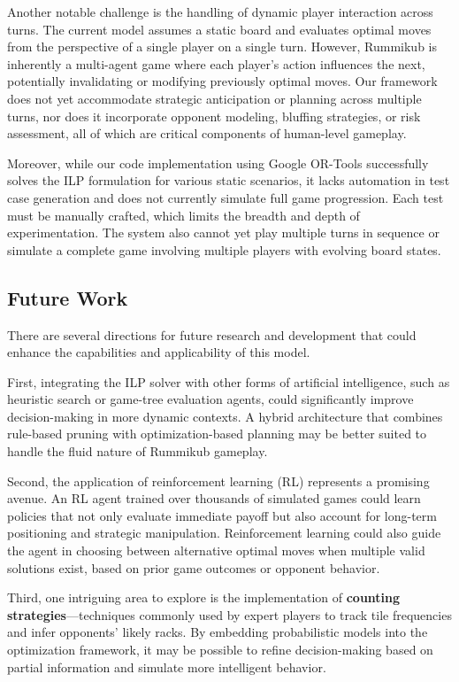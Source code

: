 \documentclass[11pt,letterpaper]{article}
\begin{document}
Another notable challenge is the handling of dynamic player interaction across turns. The current model assumes a static board and evaluates optimal moves from the perspective of a single player on a single turn. However, Rummikub is inherently a multi-agent game where each player’s action influences the next, potentially invalidating or modifying previously optimal moves. Our framework does not yet accommodate strategic anticipation or planning across multiple turns, nor does it incorporate opponent modeling, bluffing strategies, or risk assessment, all of which are critical components of human-level gameplay.

Moreover, while our code implementation using Google OR-Tools successfully solves the ILP formulation for various static scenarios, it lacks automation in test case generation and does not currently simulate full game progression. Each test must be manually crafted, which limits the breadth and depth of experimentation. The system also cannot yet play multiple turns in sequence or simulate a complete game involving multiple players with evolving board states.

\subsection*{Future Work}

There are several directions for future research and development that could enhance the capabilities and applicability of this model.

First, integrating the ILP solver with other forms of artificial intelligence, such as heuristic search or game-tree evaluation agents, could significantly improve decision-making in more dynamic contexts. A hybrid architecture that combines rule-based pruning with optimization-based planning may be better suited to handle the fluid nature of Rummikub gameplay.

Second, the application of reinforcement learning (RL) represents a promising avenue. An RL agent trained over thousands of simulated games could learn policies that not only evaluate immediate payoff but also account for long-term positioning and strategic manipulation. Reinforcement learning could also guide the agent in choosing between alternative optimal moves when multiple valid solutions exist, based on prior game outcomes or opponent behavior.

Third, one intriguing area to explore is the implementation of \textbf{counting strategies}—techniques commonly used by expert players to track tile frequencies and infer opponents’ likely racks. By embedding probabilistic models into the optimization framework, it may be possible to refine decision-making based on partial information and simulate more intelligent behavior. 
\end{document}
